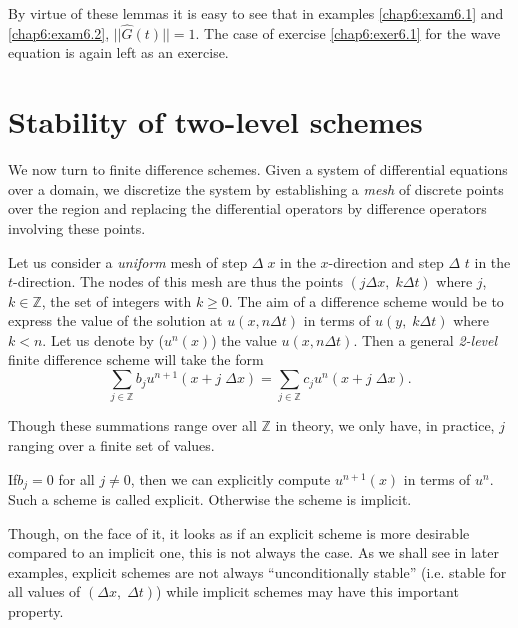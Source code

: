 By virtue of these lemmas it is easy to see that in examples
\ref{chap6:exam6.1} and \ref{chap6:exam6.2}, $||\hat{G}(t)||
=1$. The case of exercise \ref{chap6:exer6.1} for the wave equation
is again left as an exercise. 

\section{Stability of two-level schemes}\label{chap6:sec6.3}

We now turn to finite difference schemes. Given a system of
differential equations over a domain, we discretize the system by
establishing a {\em mesh} of discrete points over the region and
replacing the differential operators by difference operators involving
these points.

Let us consider a {\em uniform} mesh of step $\Delta \; x$ in the
$x$-direction and step $\Delta$ $t$  in the $t$-direction. The nodes
of this mesh are thus the points $(j \Delta x, \; k \Delta t)$ where
$j$, $k \in \mathbb{Z}$, the set of integers with $k \geq 0$. The aim
of a difference scheme would be to express the value of the solution
at $u(x, n \Delta t)$ in terms of $u(y, \; k \Delta t)$ where
$k<n$. Let us denote by ($u^n(x)$) the value $u(x, n \Delta t)$. Then
a general {\em 2-level} finite difference scheme will take the form
\begin{equation*}
\sum\limits_{j\in\mathbb{Z}} b_j u^{n+1} (x+j \; \Delta x) =
\sum\limits_{j\in\mathbb{Z}} c_j u^n (x + j \; \Delta x).\tag{6.17}\label{eq6.17}
\end{equation*}

\begin{remark}\label{chap6:rem6.1}
Though these summations range over all $\mathbb{Z}$ in theory, we
only have, in practice, $j$ ranging over a finite set of values.
\end{remark}

If\pageoriginale $b_j=0$ for all $j \neq 0$, then we can explicitly
compute $u^{n+1}(x)$ in terms of $u^n$. Such a scheme is called
explicit. Otherwise the scheme is implicit.

\begin{remark}\label{chap6:rem6.2}
Though, on the face of it, it looks as if an explicit scheme is more
desirable compared to an implicit one, this is not always the case. As
we shall see in later examples, explicit schemes are not always
``unconditionally stable'' (i.e. stable for all values of $(\Delta x,
\; \Delta t)$) while implicit schemes may have this important property.
\end{remark}

